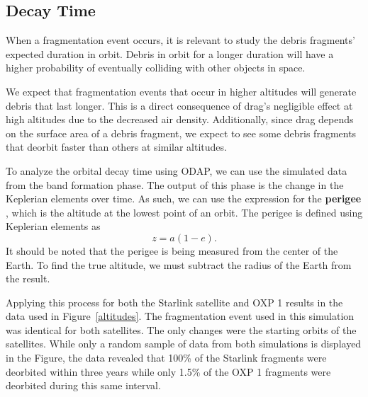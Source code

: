 \documentclass[a4paper, 12pt]{article}
\newcommand{\lindex}[1]{%
	\lowercase{\def\temp{#1}}%
	\expandafter\index\expandafter{\temp}%
}
\newcommand{\boldindex}[1]{%
	\textbf{#1}\lindex{#1}%
}
\begin{document}
\subsection{Decay Time}

When a fragmentation event occurs, it is relevant to study the debris fragments' expected duration in orbit. Debris in orbit for a longer duration will have a higher probability of eventually colliding with other objects in space.

We expect that fragmentation events that occur in higher altitudes will generate debris that last longer. This is a direct consequence of drag's negligible effect at high altitudes due to the decreased air density. Additionally, since drag depends on the surface area of a debris fragment, we expect to see some debris fragments that deorbit faster than others at similar altitudes.

To analyze the orbital decay time using ODAP, we can use the simulated data from the band formation phase. The output of this phase is the change in the Keplerian elements over time. As such, we can use the expression for the \boldindex{perigee}, which is the altitude at the lowest point of an orbit. The perigee is defined using Keplerian elements as
\begin{equation}
	z = a (1 - e).
\end{equation}
It should be noted that the perigee is being measured from the center of the Earth. To find the true altitude, we must subtract the radius of the Earth from the result.

Applying this process for both the Starlink satellite and OXP 1 results in the data used in Figure~\ref{altitudes}. The fragmentation event used in this simulation was identical for both satellites. The only changes were the starting orbits of the satellites. While only a random sample of data from both simulations is displayed in the Figure, the data revealed that 100\% of the Starlink fragments were deorbited within three years while only 1.5\% of the OXP 1 fragments were deorbited during this same interval.
\end{document}
